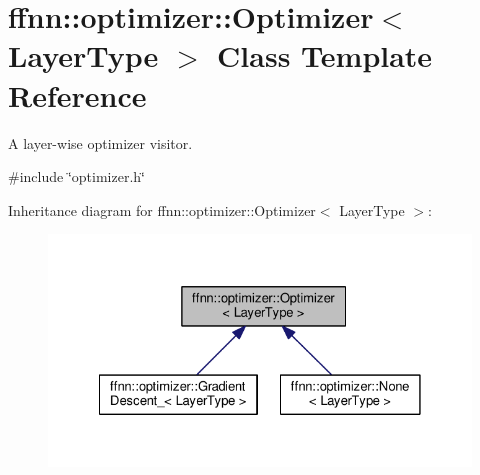 \hypertarget{classffnn_1_1optimizer_1_1_optimizer}{\section{ffnn\-:\-:optimizer\-:\-:Optimizer$<$ Layer\-Type $>$ Class Template Reference}
\label{classffnn_1_1optimizer_1_1_optimizer}
}


A layer-\/wise optimizer visitor.  




{\ttfamily \#include \char`\"{}optimizer.\-h\char`\"{}}



Inheritance diagram for ffnn\-:\-:optimizer\-:\-:Optimizer$<$ Layer\-Type $>$\-:
\nopagebreak
\begin{figure}[H]
\begin{center}
\leavevmode
\includegraphics[width=328pt]{classffnn_1_1optimizer_1_1_optimizer__inherit__graph}
\end{center}
\end{figure}
